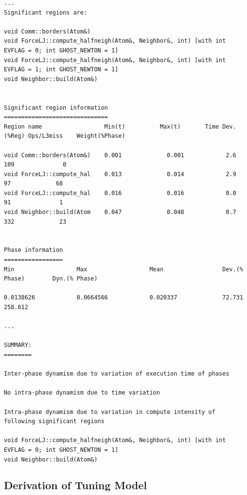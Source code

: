 \begin{lstlisting}[caption={Summary of Application Pre-analysis},label=lst:minimd_dynamism_summary]
...
Significant regions are:

void Comm::borders(Atom&)
void ForceLJ::compute_halfneigh(Atom&, Neighbor&, int) [with int EVFLAG = 0; int GHOST_NEWTON = 1]
void ForceLJ::compute_halfneigh(Atom&, Neighbor&, int) [with int EVFLAG = 1; int GHOST_NEWTON = 1]
void Neighbor::build(Atom&)


Significant region information
==============================
Region name                  Min(t)          Max(t)       Time Dev.(%Reg) Ops/L3miss    Weight(%Phase)

void Comm::borders(Atom&)    0.001             0.001            2.6           109              0
void ForceLJ::compute_hal    0.013             0.014            2.9            97             68
void ForceLJ::compute_hal    0.016             0.016            0.0            91              1
void Neighbor::build(Atom    0.047             0.048            0.7           332             23


Phase information
=================
Min                  Max                  Mean                 Dev.(% Phase)        Dyn.(% Phase)

0.0138626            0.0664566            0.020337             72.731               258.612

...

SUMMARY:
========

Inter-phase dynamism due to variation of execution time of phases

No intra-phase dynamism due to time variation

Intra-phase dynamism due to variation in compute intensity of following significant regions

void ForceLJ::compute_halfneigh(Atom&, Neighbor&, int) [with int EVFLAG = 0; int GHOST_NEWTON = 1]
void Neighbor::build(Atom&)
\end{lstlisting}

\subsection{Derivation of Tuning Model}
\label{sec:tuning_model_generation}

